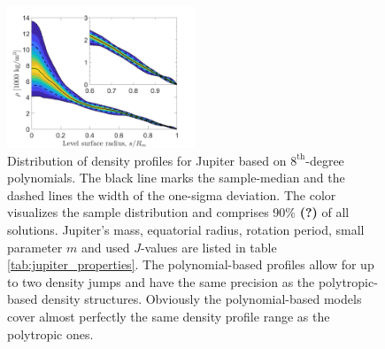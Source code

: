 \documentclass[usenatbib]{mnras}
\begin{document}
\begin{figure}
    \centering
    \includegraphics[width = 0.5\textwidth]{Figures/jupiter_ppwd_4k_d8_J24_posterior_average_w_inset.pdf}
    \caption{Distribution of density profiles for Jupiter based on $8^{\text{th}}$-degree polynomials. The black line marks the sample-median and the dashed lines the width of the one-sigma deviation. The color visualizes the sample distribution and comprises 90\% \textbf{(?)} of all solutions. Jupiter's mass, equatorial radius, rotation period, small parameter $m$ and used $J$-values are listed in table \ref{tab:jupiter_properties}. The polynomial-based profiles allow for up to two density jumps and have the same precision as the polytropic-based density structures. Obviously the polynomial-based models cover almost perfectly the same density profile range as the polytropic ones.}
    \label{fig:polynomials}
\end{figure}
\end{document}
